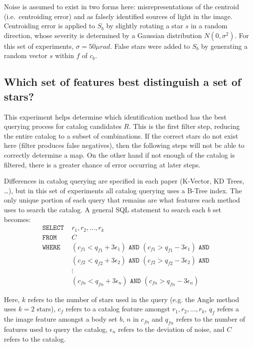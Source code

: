 Noise is assumed to exist in two forms here: misrepresentations of the centroid (i.e.\ centroiding error) and as
falsely identified sources of light in the image.
Centroiding error is applied to $S_b$ by slightly rotating a star $s$ in a random direction, whose severity is
determined by a Gaussian distribution $N(0, \sigma^2)$.
For this set of experiments, $\sigma = 50\mu rad$.
False stars were added to $S_b$ by generating a random vector $s$ within $f$ of $c_b$.

\subsection{Which set of features best distinguish a set of stars?}\label{subsec:featureUniquenessMethods}
This experiment helps determine which identification method has the best querying process for catalog candidates $R$.
This is the first filter step, reducing the entire catalog to a subset of combinations.
If the correct stars do not exist here (filter produces false negatives), then the following steps will not be able to
correctly determine a map.
On the other hand if not enough of the catalog is filtered, there is a greater chance of error occurring at later steps.

Differences in catalog querying are specified in each paper (K-Vector, KD Trees, \ldots), but in this set of
experiments all catalog querying uses a B-Tree index.
The only unique portion of each query that remains are what features each method uses to search the catalog.
A general SQL statement to search each $b$ set becomes:
\begin{align*}
    \texttt{SELECT } &r_1, r_2, \ldots, r_k \\
    \texttt{FROM } &C \\
    \texttt{WHERE } &(c_{f1} < q_{f1} + 3\epsilon_1) \texttt{ AND } (c_{f1} > q_{f1} - 3\epsilon_1) \texttt{ AND } \\
    &(c_{f2} < q_{f2} + 3\epsilon_2) \texttt{ AND } (c_{f2} > q_{f2} - 3\epsilon_2) \texttt{ AND } \\
    &\vdots \\
    &(c_{fn} < q_{fn} + 3\epsilon_n) \texttt{ AND } (c_{fn} > q_{fn} - 3\epsilon_n)
\end{align*}

Here, $k$ refers to the number of stars used in the query (e.g. the Angle method uses $k = 2$ stars), $c_f$ refers to
a catalog feature amongst $r_1, r_2, \ldots, r_k$, $q_f$ refers a the image feature amongst a body set $b$, $n$ in
$c_{fn}$ and $q_{fn}$ refers to the number of features used to query the catalog, $\epsilon_n$ refers to the deviation
of noise, and $C$ refers to the catalog.

